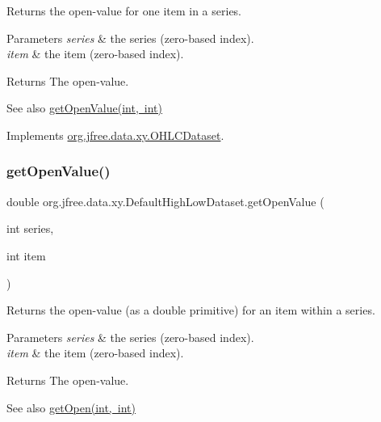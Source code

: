 Returns the open-\/value for one item in a series.


\begin{DoxyParams}{Parameters}
{\em series} & the series (zero-\/based index). \\
\hline
{\em item} & the item (zero-\/based index).\\
\hline
\end{DoxyParams}
\begin{DoxyReturn}{Returns}
The open-\/value.
\end{DoxyReturn}
\begin{DoxySeeAlso}{See also}
\mbox{\hyperlink{classorg_1_1jfree_1_1data_1_1xy_1_1_default_high_low_dataset_abff3ec5a5c09adb6bf28255be06e3fab}{get\+Open\+Value(int, int)}} 
\end{DoxySeeAlso}


Implements \mbox{\hyperlink{interfaceorg_1_1jfree_1_1data_1_1xy_1_1_o_h_l_c_dataset_a652f2a7a04925cc72472d390217fef08}{org.\+jfree.\+data.\+xy.\+O\+H\+L\+C\+Dataset}}.

\mbox{\label{classorg_1_1jfree_1_1data_1_1xy_1_1_default_high_low_dataset_abff3ec5a5c09adb6bf28255be06e3fab}} 
\subsubsection{\texorpdfstring{get\+Open\+Value()}{getOpenValue()}}
{\footnotesize\ttfamily double org.\+jfree.\+data.\+xy.\+Default\+High\+Low\+Dataset.\+get\+Open\+Value (\begin{DoxyParamCaption}\item[{int}]{series,  }\item[{int}]{item }\end{DoxyParamCaption})}

Returns the open-\/value (as a double primitive) for an item within a series.


\begin{DoxyParams}{Parameters}
{\em series} & the series (zero-\/based index). \\
\hline
{\em item} & the item (zero-\/based index).\\
\hline
\end{DoxyParams}
\begin{DoxyReturn}{Returns}
The open-\/value.
\end{DoxyReturn}
\begin{DoxySeeAlso}{See also}
\mbox{\hyperlink{classorg_1_1jfree_1_1data_1_1xy_1_1_default_high_low_dataset_a8fd97df563c199b6ace3bb56ac18b0a1}{get\+Open(int, int)}} 
\end{DoxySeeAlso}


